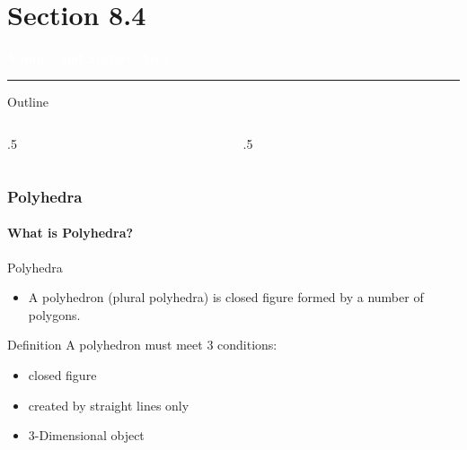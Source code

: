 \part{Section 8.4}
\begin{transitionframe}
    \begin{center}
    { 
        \Huge \textcolor{white}{\textbf{Volume and Surface Area}}
        \\[-1em]
        \noindent\textcolor{white}{\rule{12cm}{0.4pt}}
        
    }
    \end{center}
\end{transitionframe}
\begin{frame}{Outline}
    \begin{columns}[t]
        \begin{column}{.5\textwidth}
            \tableofcontents[part=4, sections={1-2}]
        \end{column}
        \begin{column}{.5\textwidth}
            \tableofcontents[part=4, sections={3-4}]
        \end{column}
    \end{columns}
\end{frame}
\section{Polyhedra}
\subsection{What is Polyhedra?}
\begin{frame}{Polyhedra}
    \begin{itemize}
        \item A polyhedron (plural polyhedra) is closed figure formed by a number of polygons.
    \end{itemize}
    \begin{block}{Definition}
        A polyhedron must meet 3 conditions:
        \begin{itemize}
            \item closed figure
            \item created by straight lines only
            \item 3-Dimensional object
        \end{itemize}
    \end{block}
    \begin{figure}[H]
        \centering
        
    \end{figure}
\end{frame}
